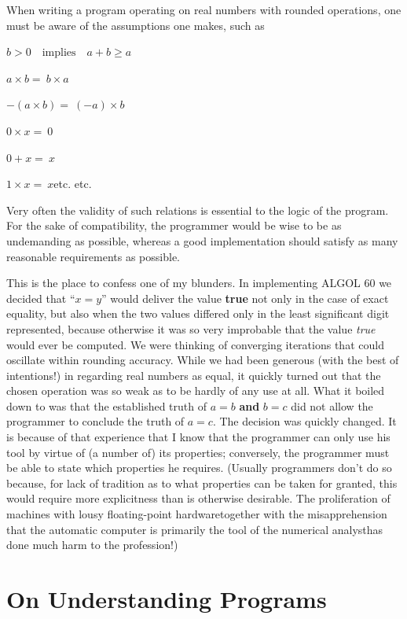 When writing a program operating on real numbers with rounded operations, one must be aware of the assumptions one makes, such as
\smallskip

\tabto*{10em}$b > 0\quad \text{implies}\quad a + b \geqslant a$

\tabto*{10em}$a\times b =\ b\times a$

\tabto*{10em}$-(a \times  b) =\ (-a)\times b$

\tabto*{10em}$0\times  x =\ 0$

\tabto*{10em}$0 + x =\ x$

\tabto*{10em}$1\times x =\ x$\quad etc. etc.
\smallskip
 
Very often the validity of such relations is essential to the logic of the program. For the sake of compatibility, the programmer would be wise to be as undemanding as possible, whereas a good implementation should satisfy as many reasonable requirements as possible.

This is the place to confess one of my blunders. In implementing ALGOL 60 we decided that ``$x = y$'' would deliver the value \textbf{true} not only in the case of exact equality, but also when the two values differed only in the least significant digit represented, because otherwise it was so very improbable that the value \textit{true} would ever be computed. We were thinking of converging iterations that could oscillate within rounding accuracy. While we had been generous (with the best of intentions!) in regarding real numbers as equal, it quickly turned out that the chosen operation was so weak as to be hardly of any use at all. What it boiled down to was that the established truth of $a = b$ \textbf{and} $b = c$ did not allow the programmer to conclude the truth of $a = c$. The decision was quickly changed. It is because of that experience that I know that the programmer can only use his tool by virtue of (a number of) its properties; conversely, the programmer must be able to state which properties he requires. (Usually programmers don't do so because, for lack of tradition as to what properties can be taken for granted, this would require more explicitness than is otherwise desirable. The proliferation of machines with lousy floating-point hardware\textemdash{}together with the misapprehension that the automatic computer is primarily the tool of the numerical analyst\textemdash{}has done much harm to the profession!)

\section[On understanding programs]{On Understanding Programs}
\label{sec:undertanding-programs}

